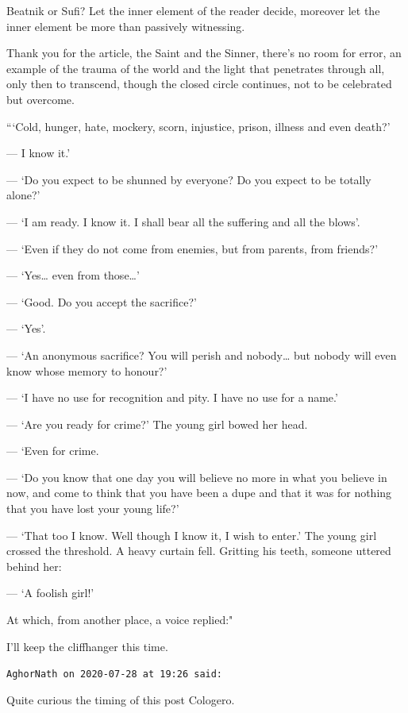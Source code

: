 \begin{footnotesize}
\begin{sffamily}
Beatnik or Sufi? Let the inner element of the reader decide, moreover let the inner element be more than passively witnessing.

Thank you for the article, the Saint and the Sinner, there's no room for error, an example of the trauma of the world and the light that penetrates through all, only then to transcend, though the closed circle continues, not to be celebrated but overcome.

```Cold, hunger, hate, mockery, scorn, injustice, prison, illness and even death?'

— I know it.'

— ‘Do you expect to be shunned by everyone? Do you expect to be totally alone?'

— ‘I am ready. I know it. I shall bear all the suffering and all the blows'.

— ‘Even if they do not come from enemies, but from parents, from friends?'

— ‘Yes… even from those…'

— ‘Good. Do you accept the sacrifice?'

— ‘Yes'.

— ‘An anonymous sacrifice? You will perish and nobody… but nobody will even know whose memory to honour?'

— ‘I have no use for recognition and pity. I have no use for a name.'

— ‘Are you ready for crime?' The young girl bowed her head.

— ‘Even for crime.

— ‘Do you know that one day you will believe no more in what you believe in now, and come to think that you have been a dupe and that it was for nothing that you have lost your young life?'

— ‘That too I know. Well though I know it, I wish to enter.' The young girl crossed the threshold. A heavy curtain fell. Gritting his teeth, someone uttered behind her:

— ‘A foolish girl!'

At which, from another place, a voice replied:"

I'll keep the cliffhanger this time.


\hfill

\texttt{AghorNath on 2020-07-28 at 19:26 said: }

Quite curious the timing of this post Cologero. 


\end{sffamily}
\end{footnotesize}
